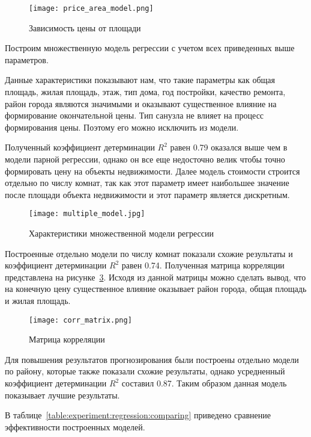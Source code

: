 \begin{figure}[!ht]
  \centering
  \texttt{[image: price\_area\_model.png]} 
  \caption{Зависимость цены от площади}
  \label{fig:experiment:price_area_model}
\end{figure}

Построим множественную модель регрессии с учетом всех приведенных выше параметров.

Данные характеристики показывают нам, что такие параметры как
общая площадь, жилая площадь, этаж, тип дома, год постройки, качество ремонта, район города являются значимыми и оказывают существенное влияние на формирование
окончательной цены. Тип санузла не влияет на процесс формирования цены. Поэтому его можно исключить из модели.

Полученный коэффициент детерминации $R^2$ равен 0.79 оказался выше чем в модели парной регрессии, однако он все еще
недосточно велик чтобы точно формировать цену на объекты недвижимости. Далее модель стоимости строится
отдельно по числу комнат, так как этот параметр имеет наибольшее значение после площади объекта недвижимости и этот параметр
является дискретным.

\begin{figure}[!ht]
  \centering
  \texttt{[image: multiple\_model.jpg]}
  \caption{Характеристики множественной модели регрессии}
  \label{fig:experiment:multiple_model}
\end{figure}

Построенные отдельно модели по числу комнат показали схожие результаты и коэффициент детерминации $R^2$ равен 0.74.
Полученная матрица корреляции представлена на рисунке~\ref{fig:experiment:corr_matrix}. Исходя из данной матрицы можно 
сделать вывод, что на конечную цену существенное влияние оказывает район города, общая площадь и жилая площадь.

\begin{figure}[!ht]
  \centering
  \texttt{[image: corr\_matrix.png]}
  \caption{Матрица корреляции}
  \label{fig:experiment:corr_matrix}
\end{figure}

Для повышения результатов прогнозирования были построены отдельно модели по району, которые также показали схожие результаты,
однако усредненный коэффициент детерминации $R^2$ составил  0.87. Таким образом данная модель показывает лучшие результаты.

В таблице~\ref{table:experiment:regression:comparing} приведено сравнение эффективности построенных моделей.

